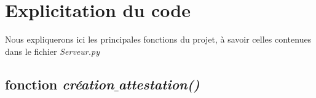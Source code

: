 \documentclass[12pt]{article}
\newcommand{\1}{\mathbbm{1}}
\begin{document}
\pagebreak






\section{Explicitation du code}

Nous expliquerons ici les principales fonctions du projet, à savoir celles contenues dans le fichier \textit{Serveur.py}

\subsection{fonction \textit{création$\_$attestation()}}
\end{document}
